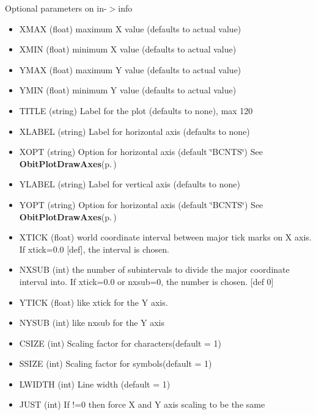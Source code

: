 Optional parameters on in-$>$info \begin{itemize}
\item XMAX (float) maximum X value (defaults to actual value) \item XMIN (float) minimum X value (defaults to actual value) \item YMAX (float) maximum Y value (defaults to actual value) \item YMIN (float) minimum Y value (defaults to actual value) \item TITLE (string) Label for the plot (defaults to none), max 120 \item XLABEL (string) Label for horizontal axis (defaults to none) \item XOPT (string) Option for horizontal axis (default \char`\"{}BCNTS\char`\"{}) See {\bf Obit\-Plot\-Draw\-Axes}{\rm (p.\,\pageref{ObitPlot_8c_a19})} \item YLABEL (string) Label for vertical axis (defaults to none) \item YOPT (string) Option for horizontal axis (default \char`\"{}BCNTS\char`\"{}) See {\bf Obit\-Plot\-Draw\-Axes}{\rm (p.\,\pageref{ObitPlot_8c_a19})} \item XTICK (float) world coordinate interval between major tick marks on X axis. If xtick=0.0 [def], the interval is chosen. \item NXSUB (int) the number of subintervals to divide the major coordinate interval into. If xtick=0.0 or nxsub=0, the number is chosen. [def 0] \item YTICK (float) like xtick for the Y axis. \item NYSUB (int) like nxsub for the Y axis \item CSIZE (int) Scaling factor for characters(default = 1) \item SSIZE (int) Scaling factor for symbols(default = 1) \item LWIDTH (int) Line width (default = 1) \item JUST (int) If !=0 then force X and Y axis scaling to be the same \end{itemize}
